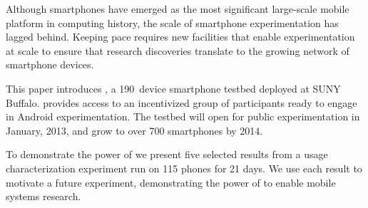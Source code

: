 Although smartphones have emerged as the most significant large-scale mobile
platform in computing history, the scale of smartphone experimentation has
lagged behind. Keeping pace requires new facilities that enable
experimentation at scale to ensure that research discoveries translate to the
growing network of smartphone devices.


This paper introduces \PhoneLab{}, a 190~device smartphone testbed deployed
at SUNY Buffalo. \PhoneLab{} provides access to an incentivized group of
participants ready to engage in Android experimentation. The testbed will
open for public experimentation in January, 2013, and grow to over 700
smartphones by 2014.



To demonstrate the power of \PhoneLab{} we present five selected results from
a usage characterization experiment run on 115 phones for 21 days. We use
each result to motivate a future \PhoneLab{} experiment, demonstrating the
power of \PhoneLab{} to enable mobile systems research.
